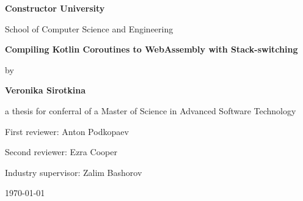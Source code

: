 \begin{titlepage}
    \thispagestyle{empty}
    \centering
    \vspace*{2cm}
    
    {\LARGE\bfseries Constructor University\par}
    \vspace{0.5cm}
    {\large School of Computer Science and Engineering\par}
    
    \vspace{3cm}
    
    {\huge\bfseries Compiling Kotlin Coroutines to WebAssembly with Stack-switching\par}
    
    \vspace{1cm}

    {\large by \par}

    \vspace{1cm}

    {\large\bfseries Veronika Sirotkina\par}

    \vspace{2cm}

    {\Large a thesis for conferral of a Master of Science in Advanced Software Technology\par}
    
    \vfill
    
    {\large First reviewer: Anton Podkopaev\par}
    {\large Second reviewer: Ezra Cooper\par}
    {\large Industry supervisor: Zalim Bashorov\par}

    \vspace{1cm}

    {\large \today\par}
    
\end{titlepage}
